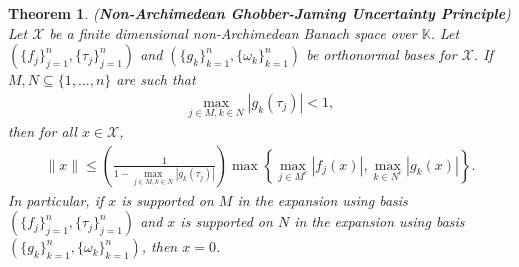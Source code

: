 \documentclass[10pt,a4paper]{amsart}
\newtheorem{theorem}{Theorem}
\begin{document}
\begin{theorem}\label{NGJ}
	(\textbf{Non-Archimedean  Ghobber-Jaming  Uncertainty Principle})
	Let $\mathcal{X}$  be a finite dimensional non-Archimedean Banach  space over $\mathbb{K}$.	Let $(\{f_j\}_{j=1}^n, \{\tau_j\}_{j=1}^n)$	and $(\{g_k\}_{k=1}^n, \{\omega_k\}_{k=1}^n)$ be orthonormal bases  for $\mathcal{X}$.  If $M,N\subseteq \{1, \dots, n\}$ are such that 
	\begin{align*}
		\displaystyle \max_{j \in M, k \in N}|g_k(\tau_j)|<1,
	\end{align*}
	then for all $x \in \mathcal{X}$, 	
	\begin{align}\label{NGH}
			\|x\|\leq  \left(\frac{1}{1-\displaystyle \max_{j \in M, k \in N}|g_k(\tau_j)|}\right)\max\left\{\displaystyle \max_{j \in M^c}|f_j(x) |, \displaystyle \max_{k \in N^c}|g_k(x)|\right\}.
	\end{align}
	In particular, if $x$ is supported on $M$ in the expansion using basis $(\{f_j\}_{j=1}^n, \{\tau_j\}_{j=1}^n)$	 and $x$ is supported on $N$ in the expansion using basis $(\{g_k\}_{k=1}^n, \{\omega_k\}_{k=1}^n)$, then $x=0$. 
\end{theorem}
\end{document}
